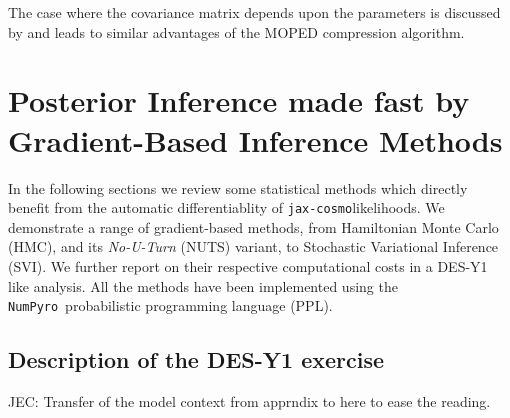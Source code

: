 \documentclass[twocolumn,twocolappendix,nofootinbib,iop]{openjournal}
\newcommand{\JEC}[1]{{\color{magenta}JEC: #1}}
\newcommand{\numpyro}{\texttt{NumPyro}}
\newcommand{\jaxcosmo}{\texttt{jax-cosmo}}
\begin{document}
%
The case where the covariance matrix depends upon the parameters is discussed by  \citet{2017MNRAS.472.4244H} and leads to similar advantages of the MOPED compression algorithm.

%
\section{Posterior Inference made fast by Gradient-Based Inference Methods}
\label{sec:chmc}
%
In the following sections we review some statistical methods which directly benefit from the automatic differentiablity of \jaxcosmo likelihoods. We demonstrate a range of gradient-based methods, from Hamiltonian Monte Carlo (HMC), and its \textit{No-U-Turn} (NUTS) variant, to Stochastic Variational Inference (SVI). We further report on their respective computational costs in a DES-Y1 like analysis. All  the methods have been implemented using the \numpyro\ probabilistic programming language (PPL). 
%
%
%


\subsection{Description of the DES-Y1 exercise}
\label{sec-DESY1}
\JEC{Transfer of the model context from apprndix to here to ease the reading.}
\end{document}
